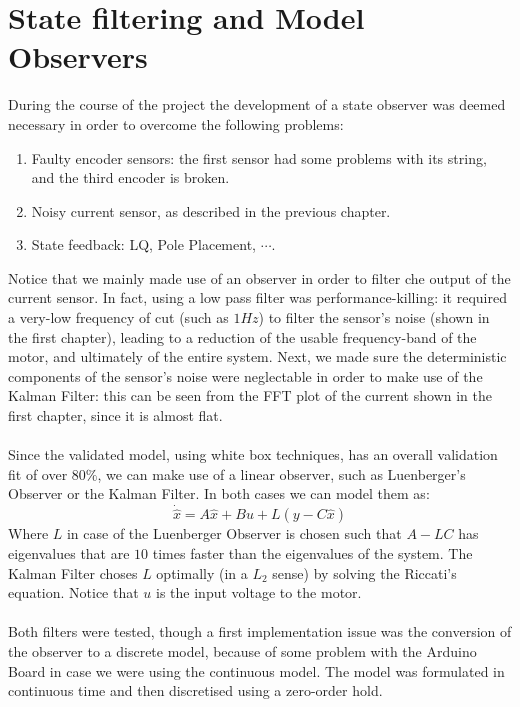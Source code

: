  \chapter{State filtering and Model Observers}
\label{kalmanfilt}
During the course of the project the development of a state observer was deemed necessary in order to overcome the following problems:
\begin{enumerate}
\item Faulty encoder sensors: the first sensor had some problems with  its string, and the third encoder is broken.
\item Noisy current sensor, as described in the previous chapter.
\item State feedback: LQ, Pole Placement, $\cdots$.
\end{enumerate}
Notice that we mainly made use of an observer in order to filter che output of the current sensor. In fact, using a low pass filter was performance-killing: it required a very-low frequency of cut (such as $1Hz$) to filter the  sensor's noise (shown in the first chapter), leading to a reduction of the usable frequency-band of the motor, and ultimately of the entire system. Next, we made sure the deterministic components of the sensor's noise were neglectable in order to make use of the Kalman Filter: this can be seen from the FFT plot of the current shown in the first chapter, since it is almost flat. \\ \\
Since the validated model, using white box techniques, has an overall validation fit of over $80\%$, we can make use of a linear observer, such as Luenberger's Observer or the Kalman Filter. In both cases we can model them as:
\begin{equation}
\dot{\hat{x}} = A \hat{x}+Bu + L(y-C\hat{x})
\end{equation}
Where $L$ in case of the Luenberger Observer is chosen such that $A-LC$ has eigenvalues that are $10$ times faster than the eigenvalues of the system. The Kalman Filter choses $L$ optimally (in a $L_2$ sense) by solving the Riccati's equation. Notice that $u$ is the input voltage to the motor.\\\\
Both filters were tested, though a first implementation issue was the conversion of the observer to a discrete model, because of some problem with the Arduino Board in case we were using the continuous model. The model was formulated in continuous time and then discretised using a zero-order hold.\\ \\
